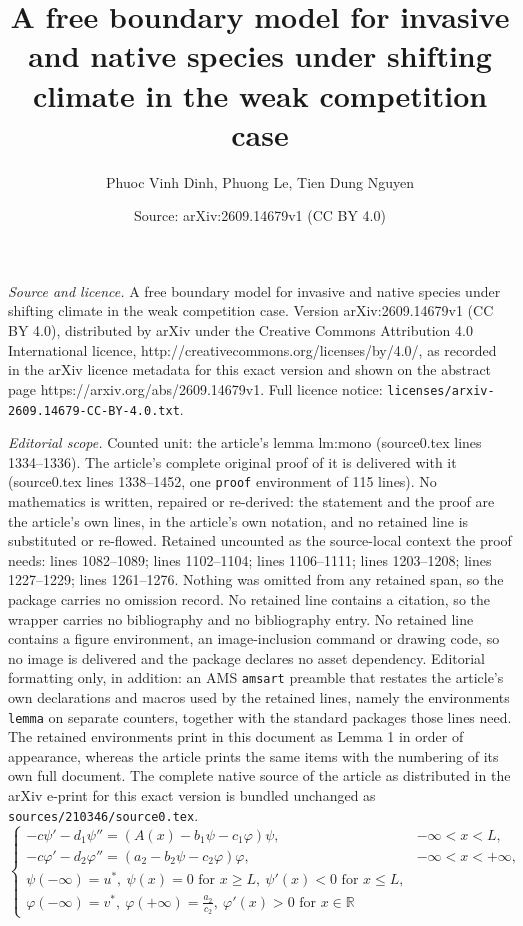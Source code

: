 \documentclass[10pt,a4paper]{amsart}
\title{A free boundary model for invasive and native species under shifting climate in the weak competition case}
\author{Phuoc Vinh Dinh, Phuong Le, Tien Dung Nguyen}
\date{Source: arXiv:2609.14679v1 (CC BY 4.0)}
\begin{document}
\maketitle

\noindent\emph{Source and licence.} A free boundary model for invasive and native species under shifting climate in the weak competition case. Version arXiv:2609.14679v1 (CC BY 4.0), distributed by arXiv under the Creative Commons Attribution 4.0 International licence, http://creativecommons.org/licenses/by/4.0/, as recorded in the arXiv licence metadata for this exact version and shown on the abstract page https://arxiv.org/abs/2609.14679v1. Full licence notice: \texttt{licenses/arxiv-2609.14679-CC-BY-4.0.txt}.\par\smallskip

\noindent\textit{Editorial scope.} Counted unit: the article's lemma lm:mono (source0.tex lines 1334--1336). The article's complete original proof of it is delivered with it (source0.tex lines 1338--1452, one \texttt{proof} environment of 115 lines). No mathematics is written, repaired or re-derived: the statement and the proof are the article's own lines, in the article's own notation, and no retained line is substituted or re-flowed.  Retained uncounted as the source-local context the proof needs: lines 1082--1089; lines 1102--1104; lines 1106--1111; lines 1203--1208; lines 1227--1229; lines 1261--1276.  Nothing was omitted from any retained span, so the package carries no omission record.  No retained line contains a citation, so the wrapper carries no bibliography and no bibliography entry.  No retained line contains a figure environment, an image-inclusion command or drawing code, so no image is delivered and the package declares no asset dependency.  Editorial formatting only, in addition: an AMS \texttt{amsart} preamble that restates the article's own declarations and macros used by the retained lines, namely the environments \texttt{lemma} on separate counters, together with the standard packages those lines need.  The retained environments print in this document as Lemma 1 in order of appearance, whereas the article prints the same items with the numbering of its own full document.  The complete native source of the article as distributed in the arXiv e-print for this exact version is bundled unchanged as \texttt{sources/210346/source0.tex}.
		\begin{equation}\label{eqlm1}
			\begin{cases}
				-c \psi' - d_1 \psi'' = (A(x) - b_1\psi - c_1\varphi)\psi, & -\infty < x < L,\\
				-c \varphi' - d_2 \varphi'' = (a_2 - b_2\psi - c_2\varphi)\varphi, & -\infty < x < +\infty,\\
				\psi(-\infty) = u^*, ~ \psi(x)=0 \text{ for } x\ge L, ~ \psi'(x)<0 \text{ for } x\le L,\\
				\varphi(-\infty) = v^*, ~ \varphi(+\infty)=\frac{a_2}{c_2}, ~ \varphi'(x)>0 \text{ for } x\in \mathbb{R}
			\end{cases}
		\end{equation}
\end{document}
